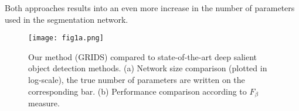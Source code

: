 \documentclass[a4paper,conference]{IEEEtran}
\begin{document}
Both approaches results into an even more increase in the number of parameters used in the segmentation network.

\begin{figure}[!t]
\texttt{[image: fig1a.png]}


\caption{Our method (GRIDS) compared to state-of-the-art deep salient object detection methods. (a) Network size comparison (plotted in log-scale), the true number of parameters are written on the corresponding bar. (b) Performance comparison according to $F_\beta$ measure.}
\label{fig0}
\end{figure}

\end{document}
